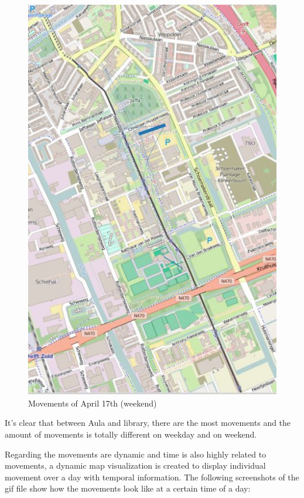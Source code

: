 \begin{figure}[H]
\includegraphics[scale=0.7,right]{pic2}
\captionsetup{justification=centering}
\caption{Movements of April 17th (weekend)}
\endminipage\hfill

\end{figure}
It's clear that between Aula and library, there are the most movements and the amount of movements is totally different on weekday and on weekend.

Regarding the movements are dynamic and time is also highly related to movements, a dynamic map visualization is created to display individual movement over a day with temporal information. The following screenshots of the gif file show how the movements look like at a certain time of a day:

